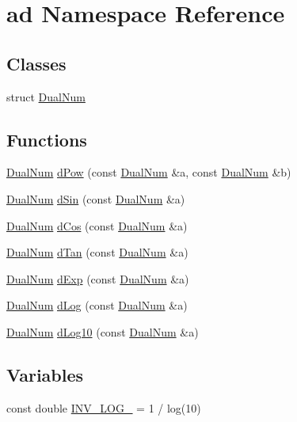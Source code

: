 \hypertarget{namespacead}{\section{ad Namespace Reference}
\label{namespacead}
}
\subsection*{Classes}
\begin{DoxyCompactItemize}
\item 
struct \hyperlink{structad_1_1_dual_num}{Dual\-Num}
\end{DoxyCompactItemize}
\subsection*{Functions}
\begin{DoxyCompactItemize}
\item 
\hyperlink{structad_1_1_dual_num}{Dual\-Num} \hyperlink{namespacead_a16d626696378a19f5d551f0e6bef10bc}{d\-Pow} (const \hyperlink{structad_1_1_dual_num}{Dual\-Num} \&a, const \hyperlink{structad_1_1_dual_num}{Dual\-Num} \&b)
\item 
\hyperlink{structad_1_1_dual_num}{Dual\-Num} \hyperlink{namespacead_a41cfc753cf5f43690908d5e0abc62ca3}{d\-Sin} (const \hyperlink{structad_1_1_dual_num}{Dual\-Num} \&a)
\item 
\hyperlink{structad_1_1_dual_num}{Dual\-Num} \hyperlink{namespacead_ac312258945abbdd5231272ed38e2702d}{d\-Cos} (const \hyperlink{structad_1_1_dual_num}{Dual\-Num} \&a)
\item 
\hyperlink{structad_1_1_dual_num}{Dual\-Num} \hyperlink{namespacead_a8962dc86383eb5551ded4dcceb6d5297}{d\-Tan} (const \hyperlink{structad_1_1_dual_num}{Dual\-Num} \&a)
\item 
\hyperlink{structad_1_1_dual_num}{Dual\-Num} \hyperlink{namespacead_ae5e8c5138b594fe5f2073cbb61d862b7}{d\-Exp} (const \hyperlink{structad_1_1_dual_num}{Dual\-Num} \&a)
\item 
\hyperlink{structad_1_1_dual_num}{Dual\-Num} \hyperlink{namespacead_a4d302a9f1ad21f602a6cf888ea44453a}{d\-Log} (const \hyperlink{structad_1_1_dual_num}{Dual\-Num} \&a)
\item 
\hyperlink{structad_1_1_dual_num}{Dual\-Num} \hyperlink{namespacead_afb0b1560a89f81066a1bb53c35d71a99}{d\-Log10} (const \hyperlink{structad_1_1_dual_num}{Dual\-Num} \&a)
\end{DoxyCompactItemize}
\subsection*{Variables}
\begin{DoxyCompactItemize}
\item 
const double \hyperlink{namespacead_a88262c084c2067846cb7236158296e90}{I\-N\-V\-\_\-\-L\-O\-G\-\_} = 1 / log(10)
\end{DoxyCompactItemize}


